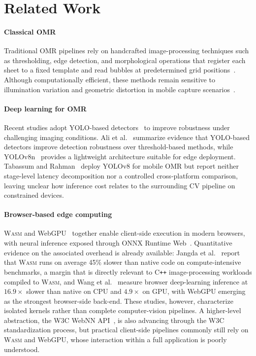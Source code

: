\documentclass[conference]{IEEEtran}
\newcommand{\wasm}{\textnormal{\textsc{Wasm}}}
\begin{document}
\section{Related Work}

\paragraph{Classical OMR}
Traditional OMR pipelines rely on handcrafted image-processing
techniques such as thresholding, edge detection, and morphological operations that register each sheet to a fixed template and
read bubbles at predetermined grid positions~\cite{patel2015,okorie2022}.
Although computationally efficient, these methods remain sensitive to
illumination variation and geometric distortion in mobile capture
scenarios~\cite{afifi2019}.

\paragraph{Deep learning for OMR}
Recent studies adopt YOLO-based detectors~\cite{redmon2016} to improve
robustness under challenging imaging conditions. Ali et
al.~\cite{ali2025} summarize evidence that YOLO-based detectors improve
detection robustness over threshold-based methods, while
YOLOv8n~\cite{jocher2023} provides a lightweight architecture suitable
for edge deployment. Tabassum and Rahman~\cite{tabassum2024} deploy
YOLOv8 for mobile OMR but report neither stage-level latency
decomposition nor a controlled cross-platform comparison, leaving
unclear how inference cost relates to the surrounding CV pipeline on
constrained devices.

\paragraph{Browser-based edge computing}
\wasm{} and WebGPU~\cite{webgpu2025} together enable client-side execution in modern browsers, with neural inference exposed
through ONNX Runtime Web~\cite{microsoft2021}. Quantitative evidence on the associated
overhead is already available: Jangda et al.~\cite{jangda2019} report
that \wasm{} runs on average 45\% slower than native code on
compute-intensive benchmarks, a margin that is directly relevant to
C\texttt{++} image-processing workloads compiled to \wasm{}, and Wang et
al.~\cite{wang2024} measure browser deep-learning inference at
$16.9\times$ slower than native on CPU and $4.9\times$ on GPU, with
WebGPU emerging as the strongest browser-side back-end. These studies,
however, characterize isolated kernels rather than complete
computer-vision pipelines. A higher-level abstraction, the W3C WebNN API~\cite{webnn2026}, is also advancing through the W3C standardization process, but practical
client-side pipelines commonly still rely on \wasm{} and WebGPU, whose interaction within
a full application is poorly understood.
\end{document}
